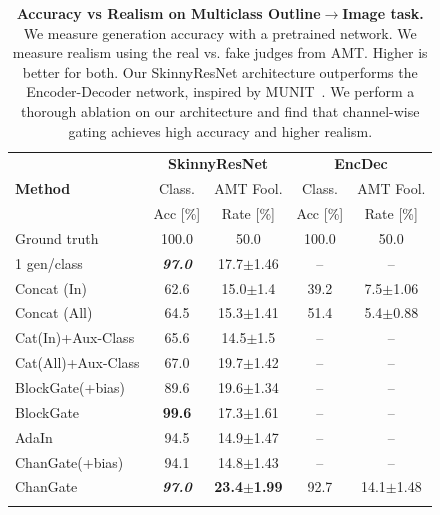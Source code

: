 \begin{table}[]
  \centering
   \resizebox{1.\linewidth}{!} {
  \setlength{\tabcolsep}{6pt}
  \begin{tabular}{l c c c c}
  \toprule
    \multirow{3}{*}{\textbf{Method}} & \multicolumn{2}{c}{ {\bf SkinnyResNet}} & \multicolumn{2}{c}{ {\bf EncDec}} \\ \cmidrule(l){2-3} \cmidrule(l){4-5}
	& Class. & AMT Fool. & Class. & AMT Fool. \\
	& Acc [\%] & Rate [\%] & Acc [\%] & Rate [\%] \\ \midrule
    Ground truth & 100.0 & 50.0 & 100.0 & 50.0 \\ \midrule
    1 gen/class & \textbf{\textit{97.0}} & 17.7$\pm$1.46 & -- & -- \\ \midrule
    Concat (In)	& 62.6 & 15.0$\pm$1.4 & 39.2 & 7.5$\pm$1.06 \\ 
    Concat (All) & 64.5 & 15.3$\pm$1.41 & 51.4 & 5.4$\pm$0.88 \\ \midrule
    Cat(In)+Aux-Class & 65.6 & 14.5$\pm$1.5 & -- & -- \\ 
    Cat(All)+Aux-Class & 67.0 & 19.7$\pm$1.42 & -- & --\\ \midrule
    BlockGate(+bias) & 89.6 & 19.6$\pm$1.34 & -- & --\\ 
    BlockGate & {\bf 99.6} & 17.3$\pm$1.61 & -- & --\\ 
    AdaIn & 94.5 & 14.9$\pm$1.47 & -- & --\\ 
    ChanGate(+bias) & 94.1 & 14.8$\pm$1.43 & -- & --\\ 
    ChanGate & \textbf{\textit{97.0}} & {\bf 23.4$\pm$1.99} & 92.7 & 14.1$\pm$1.48 \\ 
	\hline
	\vspace{-5mm}
	  \caption{\small {\bf Accuracy vs Realism on Multiclass Outline$\rightarrow$Image task.} We measure generation accuracy with a pretrained network. We measure realism using the real vs. fake judges from AMT. Higher is better for both. Our SkinnyResNet architecture outperforms the Encoder-Decoder network, inspired by MUNIT~\cite{huang2018multimodal}. We perform a thorough ablation on our architecture and find that channel-wise gating achieves high accuracy and higher realism.
  \vspace{-5mm}
  }\label{fig:acc_vs_real}
	\end{tabular} 
	}
\end{table}


